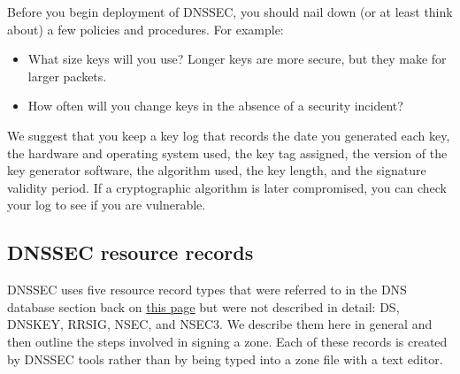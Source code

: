 Before you begin deployment of DNSSEC, you should nail down (or at least
think about) a few policies and procedures. For example:

\begin{itemize}
\item
  What size keys will you use? Longer keys are more secure, but they
  make for larger packets.
\item
  How often will you change keys in the absence of a security incident?
\end{itemize}

We suggest that you keep a key log that records the date you generated
each key, the hardware and operating system used, the key tag assigned,
the version of the key generator software, the algorithm used, the key
length, and the signature validity period. If a cryptographic algorithm
is later compromised, you can check your log to see if you are
vulnerable.

\protect\hypertarget{part0024_split_061.html}{}{}

\hypertarget{part0024_split_061.htmlux5cux23_idContainer1069}{}
\hypertarget{part0024_split_061.htmlux5cux23calibre_pb_60}{%
\subsection[DNSSEC resource
records]{\texorpdfstring{\protect\hypertarget{part0024_split_061.htmlux5cux23_idTextAnchor940}{}{}DNSSEC
resource
records}{DNSSEC resource records}}\label{part0024_split_061.htmlux5cux23calibre_pb_60}}

DNSSEC uses five resource record types that were referred to in the DNS
database section back on
\protect\hyperlink{part0024_split_019.htmlux5cux23_idTextAnchor865}{this
page} but were not described in detail:
\protect\hypertarget{part0024_split_061.htmlux5cux23_idIndexMarker2252}{}{}\protect\hypertarget{part0024_split_061.htmlux5cux23_idIndexMarker2253}{}{}DS,
\protect\hypertarget{part0024_split_061.htmlux5cux23_idIndexMarker2254}{}{}\protect\hypertarget{part0024_split_061.htmlux5cux23_idIndexMarker2255}{}{}DNSKEY,
\protect\hypertarget{part0024_split_061.htmlux5cux23_idIndexMarker2256}{}{}\protect\hypertarget{part0024_split_061.htmlux5cux23_idIndexMarker2257}{}{}RRSIG,
\protect\hypertarget{part0024_split_061.htmlux5cux23_idIndexMarker2258}{}{}\protect\hypertarget{part0024_split_061.htmlux5cux23_idIndexMarker2259}{}{}NSEC,
and
\protect\hypertarget{part0024_split_061.htmlux5cux23_idIndexMarker2260}{}{}\protect\hypertarget{part0024_split_061.htmlux5cux23_idIndexMarker2261}{}{}NSEC3.
We describe them here in general and then outline the steps involved in
signing a zone. Each of these records is created by DNSSEC tools rather
than by being typed into a zone file with a text editor.

